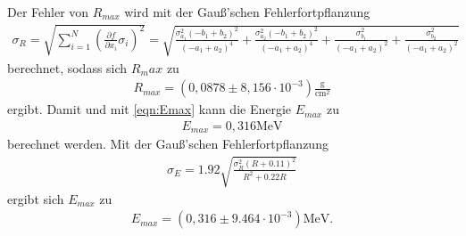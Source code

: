 Der Fehler von $R_{max}$ wird mit der Gauß'schen Fehlerfortpflanzung 
\begin{align*}
  \sigma_R = \sqrt{
      \sum\limits_{i = 1}^N
       \left( \frac{\partial f}{\partial x_i} \sigma_i \right)^{\!\! 2}
     }
     =\sqrt{\frac{\sigma_{a_{1}}^{2} \left(- b_{1} + b_{2}\right)^{2}}{\left(- a_{1} + a_{2}\right)^{4}}
  + \frac{\sigma_{a_{2}}^{2} \left(- b_{1} + b_{2}\right)^{2}}{\left(- a_{1} + a_{2}\right)^{4}} + \frac{\sigma_{b_{1}}^{2}}{\left(- a_{1}
  + a_{2}\right)^{2}} + \frac{\sigma_{b_{2}}^{2}}{\left(- a_{1} + a_{2}\right)^{2}}}
\end{align*}
berechnet, sodass sich $R_max$ zu
\begin{align}
  R_{max}= (0,0878 \pm 8,156 \cdot 10^{-3}) \frac{\si{\g}}{\si{\centi\meter^2}}
\end{align}
ergibt. Damit und mit \autoref{eqn:Emax} kann die Energie $E_{max}$ zu
\begin{align}
  E_{max}= 0,316 \si{\mega\eV}
\end{align}
berechnet werden.
Mit der Gauß'schen Fehlerfortpflanzung
\begin{align*}
  \sigma_E =1.92 \sqrt{\frac{\sigma_{R}^{2} \left(R + 0.11\right)^{2}}{R^{2} + 0.22 R}}
\end{align*}
ergibt sich $E_{max}$ zu
\begin{align}
  E_{max}= (0,316 \pm 9.464 \cdot 10^{-3}) \si{\mega\eV}.
\end{align}